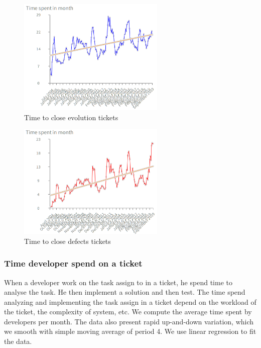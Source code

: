 \documentclass[10pt,conference]{IEEEtran}
\begin{document}
\begin{figure}[H]
  \centering
  \includegraphics[width=70mm]{./images/openCloseEvol.png}
  \caption{Time to close evolution tickets}
  \label{fig:evol}
\end{figure}

\begin{figure}[H]
  \centering
  \includegraphics[width=70mm]{./images/openCloseBug.png}
  \caption{Time to close defects tickets}
  \label{fig:defect}
\end{figure}




\subsubsection{Time developer spend on a ticket }

When a developer work on the task assign to in a ticket, he spend time to analyse  the task. 
He then implement a solution and then test.
 The time spend analyzing and implementing the task assign in a ticket depend on the workload  of the ticket, the complexity of system, etc.  
We compute the average time spent by developers per month. 
The data also present rapid up-and-down variation, which we smooth with simple moving average of period 4. We use  linear regression to fit the data.   
\end{document}
